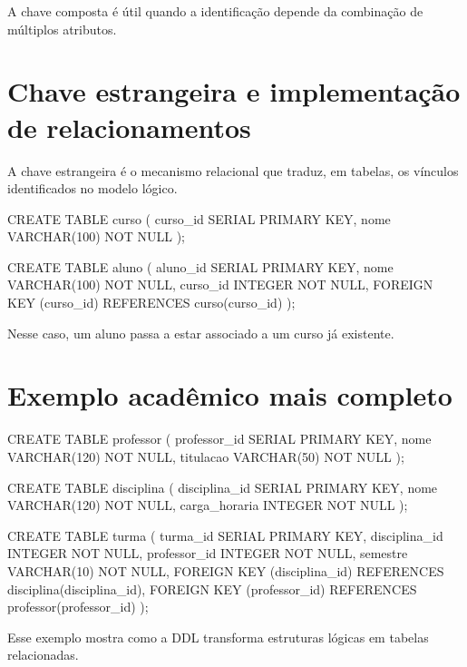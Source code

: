A chave composta é útil quando a identificação depende da combinação de múltiplos atributos.

\section{Chave estrangeira e implementação de relacionamentos}

A chave estrangeira é o mecanismo relacional que traduz, em tabelas, os vínculos identificados no modelo lógico.

\begin{sqlcode}
CREATE TABLE curso (
    curso_id SERIAL PRIMARY KEY,
    nome VARCHAR(100) NOT NULL
);
\end{sqlcode}

\begin{sqlcode}
CREATE TABLE aluno (
    aluno_id SERIAL PRIMARY KEY,
    nome VARCHAR(100) NOT NULL,
    curso_id INTEGER NOT NULL,
    FOREIGN KEY (curso_id) REFERENCES curso(curso_id)
);
\end{sqlcode}

Nesse caso, um aluno passa a estar associado a um curso já existente.

\section{Exemplo acadêmico mais completo}

\begin{sqlcode}
CREATE TABLE professor (
    professor_id SERIAL PRIMARY KEY,
    nome VARCHAR(120) NOT NULL,
    titulacao VARCHAR(50) NOT NULL
);
\end{sqlcode}

\begin{sqlcode}
CREATE TABLE disciplina (
    disciplina_id SERIAL PRIMARY KEY,
    nome VARCHAR(120) NOT NULL,
    carga_horaria INTEGER NOT NULL
);
\end{sqlcode}

\begin{sqlcode}
CREATE TABLE turma (
    turma_id SERIAL PRIMARY KEY,
    disciplina_id INTEGER NOT NULL,
    professor_id INTEGER NOT NULL,
    semestre VARCHAR(10) NOT NULL,
    FOREIGN KEY (disciplina_id) REFERENCES disciplina(disciplina_id),
    FOREIGN KEY (professor_id) REFERENCES professor(professor_id)
);
\end{sqlcode}

Esse exemplo mostra como a DDL transforma estruturas lógicas em tabelas relacionadas.

